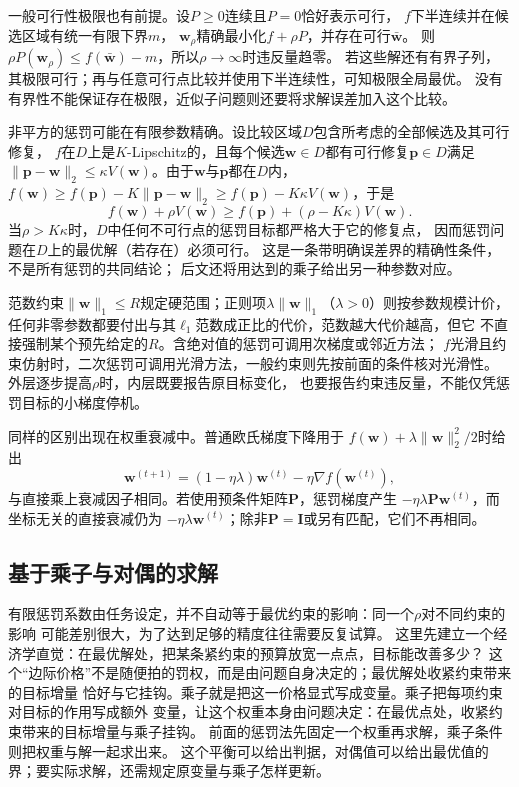一般可行性极限也有前提。设$P\geq0$连续且$P=0$恰好表示可行，
$f$下半连续并在候选区域有统一有限下界$m$，
$\bm w_\rho$精确最小化$f+\rho P$，并存在可行$\bar{\bm w}$。
则$\rho P(\bm w_\rho)\leq f(\bar{\bm w})-m$，所以$\rho\to\infty$时违反量趋零。
若这些解还有有界子列，其极限可行；再与任意可行点比较并使用下半连续性，可知极限全局最优。
没有有界性不能保证存在极限，近似子问题则还要将求解误差加入这个比较。

非平方的惩罚可能在有限参数精确。设比较区域$D$包含所考虑的全部候选及其可行修复，
$f$在$D$上是$K$-Lipschitz的，且每个候选$\bm w\in D$都有可行修复$\bm p\in D$满足
$\|\bm p-\bm w\|_2\leq\kappa V(\bm w)$。由于$\bm w$与$\bm p$都在$D$内，
$f(\bm w)\geq f(\bm p)-K\|\bm p-\bm w\|_2\geq f(\bm p)-K\kappa V(\bm w)$，于是
\[
 f(\bm w)+\rho V(\bm w)
 \geq f(\bm p)+(\rho-K\kappa)V(\bm w).
\]
当$\rho>K\kappa$时，$D$中任何不可行点的惩罚目标都严格大于它的修复点，
因而惩罚问题在$D$上的最优解（若存在）必须可行。
这是一条带明确误差界的精确性条件，不是所有惩罚的共同结论；
后文还将用达到的乘子给出另一种参数对应。

范数约束$\|\bm w\|_1\leq R$规定硬范围；正则项$\lambda\|\bm w\|_1$（$\lambda>0$）则按参数规模计价，
任何非零参数都要付出与其$\ell_1$范数成正比的代价，范数越大代价越高，但它
不直接强制某个预先给定的$R$。含绝对值的惩罚可调用次梯度或邻近方法；
$f$光滑且约束仿射时，二次惩罚可调用光滑方法，一般约束则先按前面的条件核对光滑性。
外层逐步提高$\rho$时，内层既要报告原目标变化，
也要报告约束违反量，不能仅凭惩罚目标的小梯度停机。

同样的区别出现在权重衰减中。普通欧氏梯度下降用于
$f(\bm{w})+\lambda\lVert\bm{w}\rVert_2^2/2$时给出
\[
  \bm{w}^{(t+1)}
  =(1-\eta\lambda)\bm{w}^{(t)}-\eta\nabla f(\bm{w}^{(t)}),
\]
与直接乘上衰减因子相同。若使用预条件矩阵$\bm{P}$，惩罚梯度产生
$-\eta\lambda\bm{P}\bm{w}^{(t)}$，而坐标无关的直接衰减仍为
$-\eta\lambda\bm{w}^{(t)}$；除非$\bm{P}=\bm{I}$或另有匹配，它们不再相同。

\subsection{基于乘子与对偶的求解}
\label{sec:opt-multiplier-dual-methods}

有限惩罚系数由任务设定，并不自动等于最优约束的影响：同一个$\rho$对不同约束的影响
可能差别很大，为了达到足够的精度往往需要反复试算。
这里先建立一个经济学直觉：在最优解处，把某条紧约束的预算放宽一点点，目标能改善多少？
这个“边际价格”不是随便拍的罚权，而是由问题自身决定的；最优解处收紧约束带来的目标增量
恰好与它挂钩。乘子就是把这一价格显式写成变量。乘子把每项约束对目标的作用写成额外
变量，让这个权重本身由问题决定：在最优点处，收紧约束带来的目标增量与乘子挂钩。
前面的惩罚法先固定一个权重再求解，乘子条件则把权重与解一起求出来。
这个平衡可以给出判据，对偶值可以给出最优值的界；要实际求解，还需规定原变量与乘子怎样更新。

